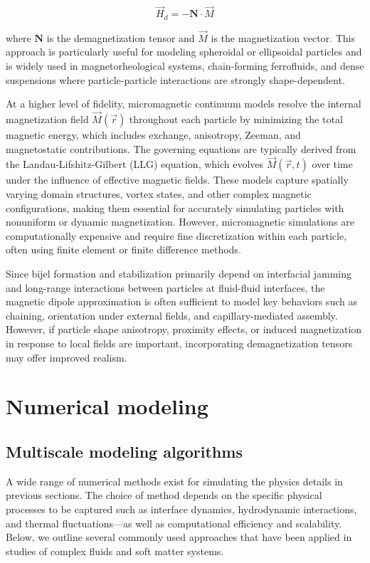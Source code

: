 \begin{equation}
    \vec{H}_d = -\mathbf{N} \cdot \vec{M}
\end{equation}

where \(\mathbf{N}\) is the demagnetization tensor and \(\vec{M}\) is the magnetization vector. \cite{takahashi_ellipsoids_2017} 
This approach is particularly useful for modeling spheroidal or ellipsoidal particles and is widely used in magnetorheological systems, chain-forming ferrofluids, and dense suspensions where 
particle-particle interactions are strongly shape-dependent.

At a higher level of fidelity, micromagnetic continuum models resolve the internal magnetization field \(\vec{M}(\vec{r})\) throughout each particle by minimizing the total magnetic energy, which 
includes exchange, anisotropy, Zeeman, and magnetostatic contributions. \cite{vivas_toward_2020} 
The governing equations are typically derived from the Landau-Lifshitz-Gilbert (LLG) equation, which evolves \(\vec{M}(\vec{r}, t)\) over time under the influence of effective magnetic fields. 
These models capture spatially varying domain structures, vortex states, and other complex magnetic configurations, making them essential for accurately simulating particles with nonuniform or dynamic 
magnetization. However, micromagnetic simulations are computationally expensive and require fine discretization within each particle, often using finite element or finite difference methods.

Since bijel formation and stabilization primarily depend on interfacial 
jamming and long-range interactions between particles at fluid-fluid interfaces, the magnetic dipole approximation is often sufficient to model key behaviors such as chaining, orientation under external 
fields, and capillary-mediated assembly. However, if particle shape anisotropy, proximity effects, or induced magnetization in response to local fields are important, incorporating demagnetization tensors 
may offer improved realism.

\section{Numerical modeling}

\subsection{Multiscale modeling algorithms}

A wide range of numerical methods exist for simulating the physics details in previous sections. The choice of method depends on the specific physical processes to be captured such as 
interface dynamics, hydrodynamic interactions, and thermal fluctuations—as well as computational efficiency and scalability. Below, we outline several commonly used approaches that have been 
applied in studies of complex fluids and soft matter systems.

